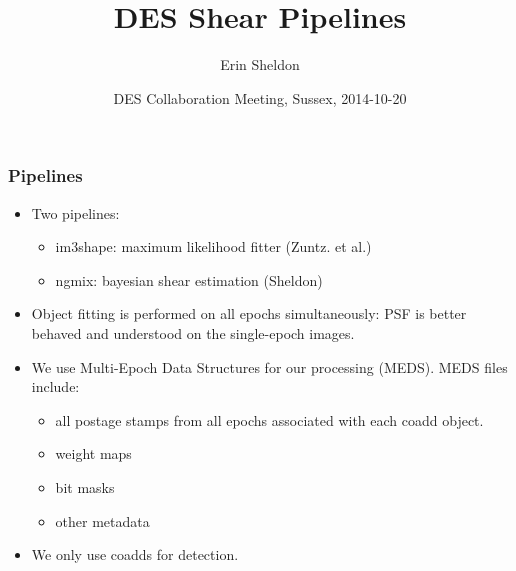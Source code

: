 \documentclass{beamer}
\begin{document}


\title{DES Shear Pipelines}
\author{Erin Sheldon}
\date{DES Collaboration Meeting, Sussex, 2014-10-20}

\frame{\titlepage}
 
\frame
{
    \frametitle{Pipelines}

    \begin{itemize}
        \item Two pipelines:
            \begin{itemize}
                \item im3shape: maximum likelihood fitter (Zuntz. et al.)
                \item ngmix: bayesian shear estimation (Sheldon)
            \end{itemize}

        \item Object fitting is performed on all epochs simultaneously: PSF is
            better behaved and understood on the single-epoch images.

        \item We use Multi-Epoch Data Structures for our processing (MEDS).
            MEDS files include:
            \begin{itemize}
                \item all postage stamps from all epochs associated with
                    each coadd object.
                \item weight maps
                \item bit masks
                \item other metadata
            \end{itemize}

        \item We only use coadds for detection.

    \end{itemize}
}
\end{document}

